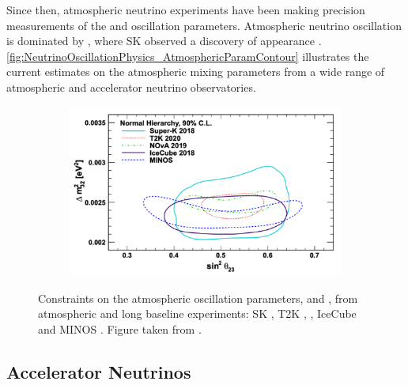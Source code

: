 Since then, atmospheric neutrino experiments have been making precision measurements of the \sinsqatm and  oscillation parameters.
Atmospheric neutrino oscillation is dominated by , where SK observed a \quickmath{4.6\sigma} discovery of \quickmath{\nu_{\tau}} appearance \cite{Li_2018}. \autoref{fig:NeutrinoOscillationPhysics_AtmosphericParamContour} illustrates the current estimates on the atmospheric mixing parameters from a wide range of atmospheric and accelerator neutrino observatories.

\begin{figure}[h]
  \begin{subfigure}[t]{0.90\textwidth}
    \includegraphics[width=\textwidth, trim={0mm 0mm 0mm 0mm}, clip,page=1]{Figures/Theory/AtmosphericParams.pdf}
  \end{subfigure}
  \caption{Constraints on the atmospheric oscillation parameters, \sinsqatm and \delmsqatm, from atmospheric and long baseline experiments: SK \cite{Kamiokande_Collaboration2017-nf}, T2K \cite{T2K_Collaboration2018-sm},  \cite{Acero2019-rw}, IceCube \cite{Aartsen2018-cz} and MINOS \cite{Adamson2014-tt}. Figure taken from \cite{Athar_2022}.}
  \label{fig:NeutrinoOscillationPhysics_AtmosphericParamContour}
\end{figure}

\subsection{Accelerator Neutrinos}
\label{subsec:NeutrinoOscillationPhysics_AcceleratorNeutrinos}


